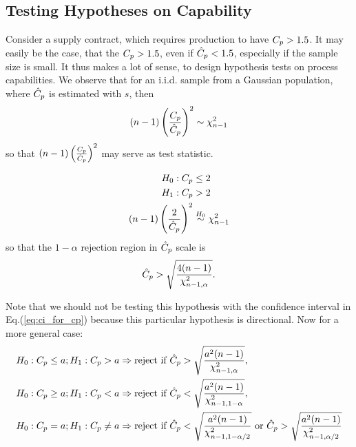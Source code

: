 \subsection{Testing Hypotheses on Capability}
Consider a supply contract, which requires production to have $C_p>1.5$. 
It may easily be the case, that the $C_p>1.5$, even if $\hat{C}_p<1.5$, especially if the sample size is small.
It thus makes a lot of sense, to design hypothesis tests on process capabilities. 
We observe that for an i.i.d. sample from a Gaussian population, where $\hat{C}_p$ is estimated with $s$, then
\begin{align}
\label{eq:cp_dist}
	(n-1) \left( \frac{C_p}{\hat{C}_p} \right)^2  \sim \chi^2_{n-1}
\end{align} 
so that $(n-1) \left( \frac{C_p}{\hat{C}_p} \right)^2 $ may serve as test statistic.

\begin{example}
\begin{align*}
	H_0: C_p &\leq 2	\\
	H_1:C_p &> 2 \\
	(n-1) \left( \frac{2}{\hat{C}_p} \right)^2  &\overset{H_0}{\sim} \chi^2_{n-1}
\end{align*}
so that the $1-\alpha$ rejection region in $\hat{C}_p$ scale is 
\begin{align*}
	\hat{C}_p > \sqrt{\frac{4 (n-1)}{\chi^2_{n-1,\alpha}}} .
\end{align*}
\end{example}
Note that we should not be testing this hypothesis with the confidence interval in Eq.(\ref{eq:ci_for_cp}) because this particular hypothesis is directional.
Now for a more general case:
\begin{align*}
	H_0: C_p \leq a; 
	H_1:C_p > a 
	&\Rightarrow \text{reject if } \hat{C}_p > \sqrt{\frac{a^2 (n-1)}{\chi^2_{n-1,\alpha}}},\\
	H_0: C_p \geq  a; 
	H_1:C_p < a 
	&\Rightarrow \text{reject if } \hat{C}_p < \sqrt{\frac{a^2 (n-1)}{\chi^2_{n-1,1-\alpha}}}, \\
	H_0: C_p =  a; 
	H_1:C_p \neq a 
	&\Rightarrow \text{reject if } \hat{C}_p < \sqrt{\frac{a^2 (n-1)}{\chi^2_{n-1,1-\alpha/2}}}
	\text{ or } \hat{C}_p > \sqrt{\frac{a^2 (n-1)}{\chi^2_{n-1,\alpha/2}}} \\
\end{align*}















